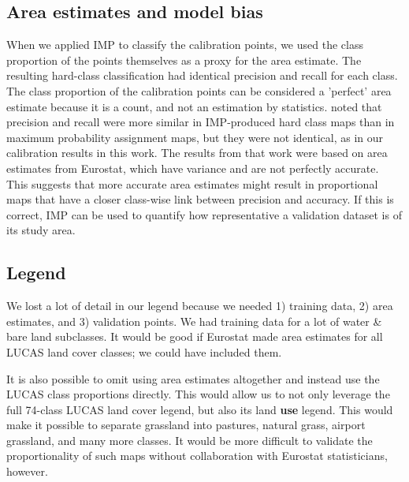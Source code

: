     \subsection{Area estimates and model bias}

        When we applied IMP to classify the calibration points, we used the class proportion of the points themselves as a proxy for the area estimate. The resulting hard-class classification had identical precision and recall for each class. The class proportion of the calibration points can be considered a 'perfect' area estimate because it is a count, and not an estimation by statistics. \citet{witjes2024iterative} noted that precision and recall were more similar in IMP-produced hard class maps than in maximum probability assignment maps, but they were not identical, as in our calibration results in this work. The results from that work were based on area estimates from Eurostat, which have variance and are not perfectly accurate. This suggests that more accurate area estimates might result in proportional maps that have a closer class-wise link between precision and accuracy. If this is correct, IMP can be used to quantify how representative a validation dataset is of its study area.
    
    \subsection{Legend}
        We lost a lot of detail in our legend because we needed 1) training data, 2) area estimates, and 3) validation points. We had training data for a lot of water \& bare land subclasses. It would be good if Eurostat made area estimates for all LUCAS land cover classes; we could have included them.

        It is also possible to omit using area estimates altogether and instead use the LUCAS class proportions directly. This would allow us to not only leverage the full 74-class LUCAS land cover legend, but also its land \textbf{use} legend. This would make it possible to separate grassland into pastures, natural grass, airport grassland, and many more classes. It would be more difficult to validate the proportionality of such maps without collaboration with Eurostat statisticians, however. 

        